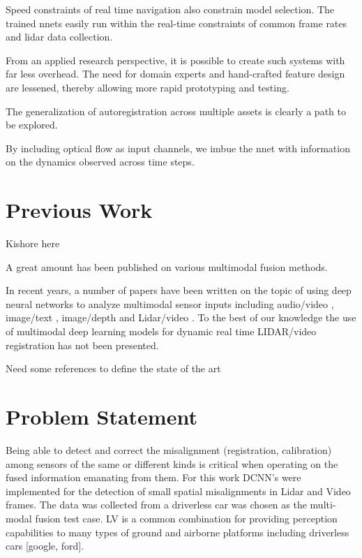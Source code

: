 \documentclass{article}
\begin{document}
Speed constraints of real time navigation also constrain model selection. The trained nnets easily run within the real-time constraints of common frame rates and lidar data collection.

From an applied research perspective, it is possible to create such systems with far less overhead. The need for domain experts and hand-crafted feature design are lessened, thereby allowing more rapid prototyping and testing. 

The generalization of autoregistration across multiple assets is clearly a path to be explored. 

By including optical flow as input channels, we imbue the nnet with information on the dynamics observed across time steps. 

\section{Previous Work} %

Kishore here

A great amount has been published on various multimodal fusion methods. 


In recent years, a number of papers have been written on the topic of using deep neural networks to analyze multimodal sensor inputs including audio/video \cite{Ngiam2011Multimodal} \cite{Kim2013Deep-Learn}, image/text \cite{Srivastava2012Multimodal}, image/depth \cite{Lenz2013Deep-Learn} and Lidar/video  \cite{Thrun2011Googles-dr}. To the best of our knowledge the use of multimodal deep learning models for dynamic real time LIDAR/video registration has not been presented. 


\label{sec:previous_work}
Need some references to define the state of the art 




\section{Problem Statement} %
\label{sec:problem_statement}

Being able to detect and correct the misalignment (registration, calibration) among sensors of the same or different kinds is critical when operating on the fused information emanating from them. For this work DCNN's were implemented for the detection of small spatial misalignments in Lidar and Video frames. The data was collected from a driverless car was chosen as the multi-modal fusion test case. LV is a common combination for providing perception capabilities to many types of ground and airborne platforms including driverless cars [google, ford]. 
\end{document}
